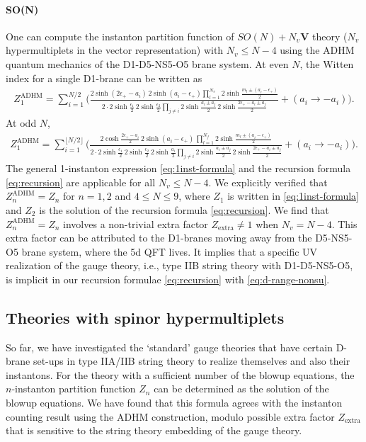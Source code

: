 \documentclass[letterpaper, 11pt]{article}
\def\e{\epsilon}
\begin{document}
{\paragraph{SO(N)} One can compute the instanton partition function of $SO(N) + N_v \mathbf{V}$ theory ($N_v$ hypermultiplets in the vector representation) with $N_v \leq N-4$ using the ADHM quantum mechanics of the D1-D5-NS5-O5 brane system. At even $N$, the Witten index for a single D1-brane can be written as
\begin{align}
Z_1^\text{ADHM} = \sum_{i=1}^{N/2}\bigg(\frac{2\sinh(2\e_+-a_i)\,2\sinh(a_i-\e_+)\prod_{l=1}^{N_v}2\sinh\frac{m_l\pm(a_i-\e_+)}{2}}{2 \cdot 2\sinh\frac{\e_1}{2}\,2\sinh\frac{\e_2}{2}\prod_{j\neq i}2\sinh\frac{a_i\pm a_j}{2}\,2\sinh\frac{2\e_+-a_i\pm a_j}{2}}+(a_i\rightarrow -a_i)\bigg).
\end{align}
At odd $N$,
\begin{align}
  Z_1^\text{ADHM} =\sum_{i=1}^{\lfloor N/2\rfloor}\bigg(\frac{2\cosh\frac{2\e_+-a_i}{2}\,2\sinh(a_i-\e_+)\,\prod_{l=1}^{N_f}2\sinh\frac{m_l\pm(a_i-\e_+)}{2}}{2 \cdot 2\sinh\frac{\e_1}{2}\,2\sinh\frac{\e_2}{2}\, 2\sinh\frac{a_i}{2}\prod_{j\neq i}2\sinh\frac{a_i\pm a_j}{2}\,2\sinh\frac{2\e_+-a_i\pm a_j}{2}}+(a_i\rightarrow -a_i)\bigg).
\end{align}
The general 1-instanton expression \eqref{eq:1inst-formula} and the recursion formula \eqref{eq:recursion} are applicable for all  $N_v \leq N-4$. We explicitly verified that $Z_n^\text{ADHM} = Z_n$ for $n=1, 2$ and $4 \leq N \leq 9$, where $Z_1$ is written in \eqref{eq:1inst-formula} and $Z_2$ is the solution of the recursion formula \eqref{eq:recursion}.  We find that $Z_n^\text{ADHM} = Z_n$ involves a non-trivial extra factor $Z_\text{extra} \neq 1$ when $N_v = N-4$. This extra factor can be attributed to the D1-branes moving away from the D5-NS5-O5 brane system, where the 5d QFT lives. It implies that a specific UV realization of the gauge theory, i.e., type IIB string theory with D1-D5-NS5-O5, is implicit in our recursion formulae \eqref{eq:recursion} with \eqref{eq:d-range-nonsu}.
 

\subsection{Theories with spinor hypermultiplets}
\label{subsec:spinor}

So far, we have investigated the `standard' gauge theories that have certain D-brane set-ups in type IIA/IIB string theory to realize themselves and also their instantons. For the theory with a sufficient number of the blowup equations, the $n$-instanton partition function $Z_n$ can be determined as the solution of the blowup equations. We have found that this formula agrees with the instanton counting result using the ADHM construction, modulo possible extra factor $Z_\text{extra}$ that is sensitive to the string theory embedding of the gauge theory.

}
\end{document}
